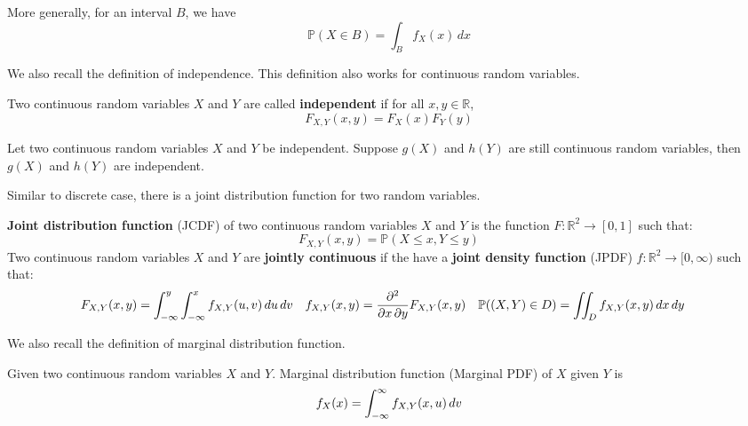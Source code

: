 \documentclass{huhtakm-template-book}
\newcommand{\prob}{\mathbb{P}}
\begin{document}
\begin{rem}
	More generally, for an interval $B$, we have
	\begin{equation*}
		\prob(X\in B)=\int_{B}f_{X}(x)\,dx
	\end{equation*}
\end{rem}

\newpage
We also recall the definition of independence. This definition also works for continuous random variables.
\begin{defn}
	Two continuous random variables $X$ and $Y$ are called \textbf{independent} if for all $x,y\in\mathbb{R}$,
	\begin{equation*}
		F_{X,Y}(x,y)=F_{X}(x)F_{Y}(y)
	\end{equation*}
\end{defn}
\begin{thm}
	Let two continuous random variables $X$ and $Y$ be independent. Suppose $g(X)$ and $h(Y)$ are still continuous random variables, then $g(X)$ and $h(Y)$ are independent.
\end{thm}
Similar to discrete case, there is a joint distribution function for two random variables.
\begin{defn}
	\textbf{Joint distribution function} (JCDF) of two continuous  random variables $X$ and $Y$ is the function $F:\mathbb{R}^{2}\to[0,1]$ such that:
	\begin{equation*}
		F_{X,Y}(x,y)=\prob(X\leq x,Y\leq y)
	\end{equation*}
	Two continuous random variables $X$ and $Y$ are \textbf{jointly continuous} if the have a \textbf{joint density function} (JPDF) $f:\mathbb{R}^{2}\to[0,\infty)$ such that:
	\begin{align*}
		F_{X,Y}(x,y)&=\intlu{-\infty}{y}\intlu{-\infty}{x}f_{X,Y}(u,v)\,du\,dv & f_{X,Y}(x,y)&=\pdv*{F_{X,Y}(x,y)}{x,y} & \prob((X,Y)\in D)&=\iint_{D}f_{X,Y}(x,y)\,dx\,dy
	\end{align*}
\end{defn}
We also recall the definition of marginal distribution function.
\begin{defn}
	Given two continuous random variables $X$ and $Y$. Marginal distribution function (Marginal PDF) of $X$ given $Y$ is
	\begin{equation*}
		f_{X}(x)=\int_{-\infty}^{\infty} f_{X,Y}(x,u)\,dv
	\end{equation*}
\end{defn}
\end{document}
